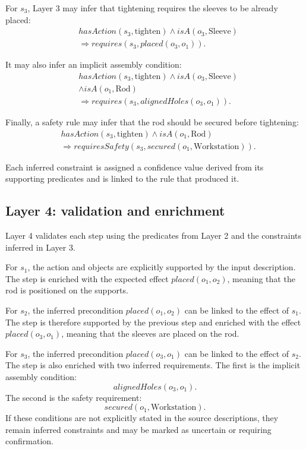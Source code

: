 For $s_3$, Layer 3 may infer that tightening requires the sleeves to be already placed:
\[
\begin{aligned}
&hasAction(s_3,\text{tighten}) \wedge isA(o_3,\text{Sleeve}) \\
&\Rightarrow requires(s_3, placed(o_3,o_1)).
\end{aligned}
\]

It may also infer an implicit assembly condition:
\[
\begin{aligned}
&hasAction(s_3,\text{tighten}) \wedge isA(o_3,\text{Sleeve}) \\
&\wedge isA(o_1,\text{Rod}) \\
&\Rightarrow requires(s_3, alignedHoles(o_3,o_1)).
\end{aligned}
\]

Finally, a safety rule may infer that the rod should be secured before tightening:
\[
\begin{aligned}
&hasAction(s_3,\text{tighten}) \wedge isA(o_1,\text{Rod}) \\
&\Rightarrow requiresSafety(s_3, secured(o_1,\text{Workstation})).
\end{aligned}
\]


Each inferred constraint is assigned a confidence value derived from its supporting predicates and is linked to the rule that produced it.

\subsection{Layer 4: validation and enrichment}

Layer 4 validates each step using the predicates from Layer 2 and the constraints inferred in Layer 3.

For $s_1$, the action and objects are explicitly supported by the input description. The step is enriched with the expected effect $placed(o_1,o_2)$, meaning that the rod is positioned on the supports.

For $s_2$, the inferred precondition $placed(o_1,o_2)$ can be linked to the effect of $s_1$. The step is therefore supported by the previous step and enriched with the effect $placed(o_3,o_1)$, meaning that the sleeves are placed on the rod.

For $s_3$, the inferred precondition $placed(o_3,o_1)$ can be linked to the effect of $s_2$. The step is also enriched with two inferred requirements. The first is the implicit assembly condition:
\[
alignedHoles(o_3,o_1).
\]
The second is the safety requirement:
\[
secured(o_1,\text{Workstation}).
\]
If these conditions are not explicitly stated in the source descriptions, they remain inferred constraints and may be marked as uncertain or requiring confirmation.

